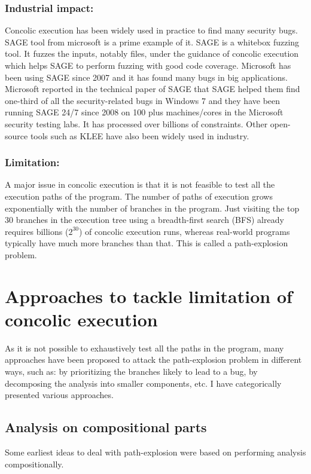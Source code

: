 \documentclass[ runningheads,
               a4paper]{llncs}
\begin{document}
\subsubsection{Industrial impact:}
Concolic execution has been widely used in practice to find many security bugs. SAGE \cite{godefroid2012sage} tool from microsoft is a prime example of it. SAGE is a whitebox fuzzing tool. It fuzzes the inputs, notably files,
under the guidance of concolic execution which helps SAGE to perform fuzzing with good code coverage. Microsoft has been using SAGE since 2007 and it has found many bugs in big applications. Microsoft reported in the technical paper of SAGE \cite{godefroid2012sage} that SAGE helped them find one-third of all the security-related bugs in Windows 7 and they have been running SAGE 24/7 since 2008 on 100 plus machines/cores in the Microsoft security testing labs. It has processed over billions of constraints. Other open-source tools such as KLEE \cite{cadar2008klee} have also been widely used in industry.


\subsubsection{Limitation:}
A major issue in concolic execution is that it is not feasible to test all the execution paths of the program. The number of paths of execution grows exponentially with the number of branches in the program. Just visiting the top 30 branches in the execution tree using a breadth-first search (BFS) already requires billions (\(2^{30}\)) of concolic execution runs, whereas real-world programs typically have much more branches than that. This is called a path-explosion problem.






\section{Approaches to tackle limitation of concolic execution}
As it is not possible to exhaustively test all the paths in the program, many approaches have been proposed to attack the path-explosion problem in different ways, such as: by prioritizing the branches likely to lead to a bug, by decomposing the analysis into smaller components, etc. I have categorically presented various approaches.




\subsection{Analysis on compositional parts}
Some earliest ideas to deal with path-explosion were based on performing analysis compositionally.
\end{document}
